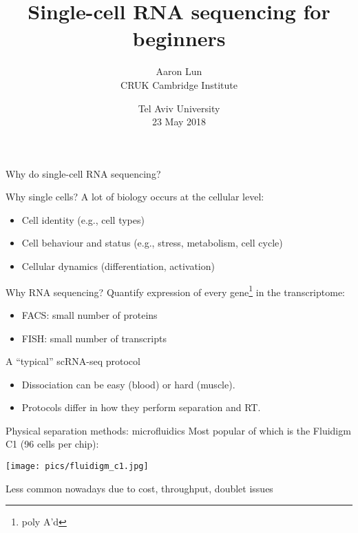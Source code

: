 \documentclass{beamer}
\title{Single-cell RNA sequencing for beginners}
\author{Aaron Lun \\[0.1in]
\footnotesize{CRUK Cambridge Institute}
}
\date{
\footnotesize{Tel Aviv University}\\[0.1in]
23 May 2018
}
\begin{document}
\maketitle

\begin{frame}{Why do single-cell RNA sequencing?}

\begin{exampleblock}{Why single cells?}
A lot of biology occurs at the cellular level:
\begin{itemize}
\item Cell identity (e.g., cell types)
\item Cell behaviour and status (e.g., stress, metabolism, cell cycle)
\item Cellular dynamics (differentiation, activation)
\end{itemize}
\end{exampleblock}

\begin{exampleblock}{Why RNA sequencing?}
Quantify expression of every gene\footnote{poly A'd} in the transcriptome:
\begin{itemize}
\item FACS: small number of proteins
\item FISH: small number of transcripts
\end{itemize}
\end{exampleblock}
\end{frame}

\begin{frame}{A ``typical'' scRNA-seq protocol}
\noindent{}\\[0.1in]

\begin{itemize}
\item Dissociation can be easy (blood) or hard (muscle).
\item Protocols differ in how they perform separation and RT.
\end{itemize}
\end{frame}

\begin{frame}{Physical separation methods: microfluidics}
Most popular of which is the Fluidigm C1 (96 cells per chip):
\begin{center}
\texttt{[image: pics/fluidigm\_c1.jpg]}
\end{center}
Less common nowadays due to cost, throughput, doublet issues
\end{frame}
\end{document}
